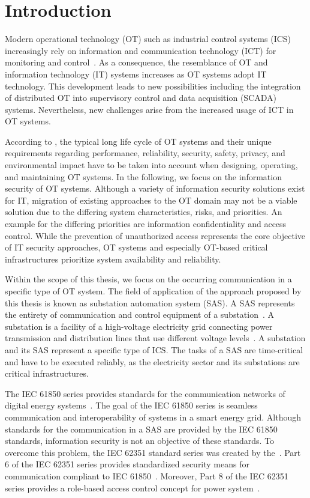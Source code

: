 \chapter{Introduction}
\label{ch:introduction}
Modern operational technology (OT) such as industrial control systems (ICS) increasingly rely on information and communication technology (ICT) for monitoring and control~\cite{Stouffer2023}.
As a consequence, the resemblance of OT and information technology (IT) systems increases as OT systems adopt IT technology.
This development leads to new possibilities including the integration of distributed OT into supervisory control and data acquisition (SCADA) systems.
Nevertheless, new challenges arise from the increased usage of ICT in OT systems.

According to \citeauthor{Stouffer2023} \cite{Stouffer2023}, the typical long life cycle of OT systems and their unique requirements regarding performance, reliability, security, safety, privacy, and environmental impact have to be taken into account when designing, operating, and maintaining OT systems.
In the following, we focus on the information security of OT systems.
Although a variety of information security solutions exist for IT, migration of existing approaches to the OT domain may not be a viable solution due to the differing system characteristics, risks, and priorities.
An example for the differing priorities are information confidentiality and access control.
While the prevention of unauthorized access represents the core objective of IT security approaches, OT systems and especially OT-based critical infrastructures prioritize system availability and reliability.

Within the scope of this thesis, we focus on the occurring communication in a specific type of OT system.
The field of application of the approach proposed by this thesis is known as substation automation system (SAS).
A SAS represents the entirety of communication and control equipment of a substation~\cite{Padilla2015}.
A substation is a facility of a high-voltage electricity grid connecting power transmission and distribution lines that use different voltage levels~\cite{oshaSubstation}.
A substation and its SAS represent a specific type of ICS.
The tasks of a SAS are time-critical and have to be executed reliably, as the electricity sector and its substations are critical infrastructures.

The IEC 61850 series provides standards for the communication networks of digital energy systems~\cite{IEC61850P5}.
The goal of the IEC 61850 series is seamless communication and interoperability of systems in a smart energy grid.
Although standards for the communication in a SAS are provided by the IEC 61850 standards, information security is not an objective of these standards.
To overcome this problem, the IEC 62351 standard series was created by the~\citeauthor{IEC62351P6}.
Part 6 of the IEC 62351 series provides standardized security means for communication compliant to IEC 61850~\cite{IEC62351P6}.
Moreover, Part 8 of the IEC 62351 series provides a role-based access control concept for power system~\cite{IEC62351P8}.

